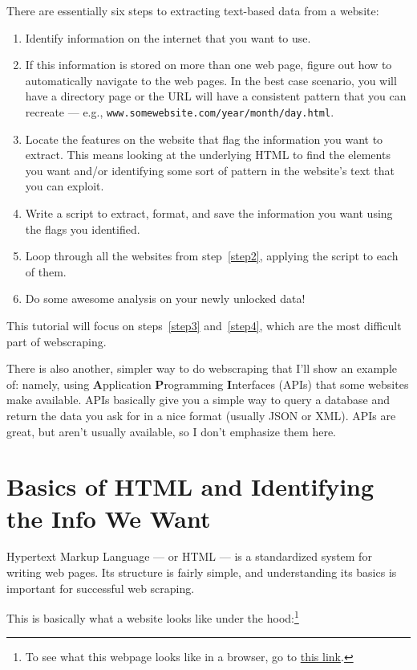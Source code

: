 \documentclass{article}\usepackage[]{graphicx}\usepackage[]{color}
\begin{document}
There are essentially six steps to extracting text-based data from a website:
\begin{enumerate}
  \item Identify information on the internet that you want to use. 
  \item If this information is stored on more than one web page, figure out how to automatically navigate to the web pages. In the best case scenario, you will have a directory page or the URL will have a consistent pattern that you can recreate --- e.g., \texttt{www.somewebsite.com/year/month/day.html}.\label{step2}
  \item Locate the features on the website that flag the information you want to extract. This means looking at the underlying HTML to find the elements you want and/or identifying some sort of pattern in the website's text that you can exploit.\label{step3}
  \item Write a script to extract, format, and save the information you want using the flags you identified.\label{step4}
  \item Loop through all the websites from step~\ref{step2}, applying the script to each of them.
  \item Do some awesome analysis on your newly unlocked data!\label{laststep}
\end{enumerate}
This tutorial will focus on steps~\ref{step3} and~\ref{step4}, which are the most difficult part of webscraping. 

There is also another, simpler way to do webscraping that I'll show an example of: namely, using \textbf{A}pplication \textbf{P}rogramming \textbf{I}nterfaces (APIs) that some websites make available. APIs basically give you a simple way to query a database and return the data you ask for in a nice format (usually JSON or XML). APIs are great, but aren't usually available, so I don't emphasize them here.

\section{Basics of HTML and Identifying the Info We Want}

Hypertext Markup Language --- or HTML --- is a standardized system for writing web pages. Its structure is fairly simple, and understanding its basics is important for successful web scraping. 

This is basically what a website looks like under the hood:\footnote{To see what this webpage looks like in a browser, go to \href{http://stanford.edu/~wpmarble/webscraping_tutorial/html/silly_webpage.html}{this link}.}
\end{document}
